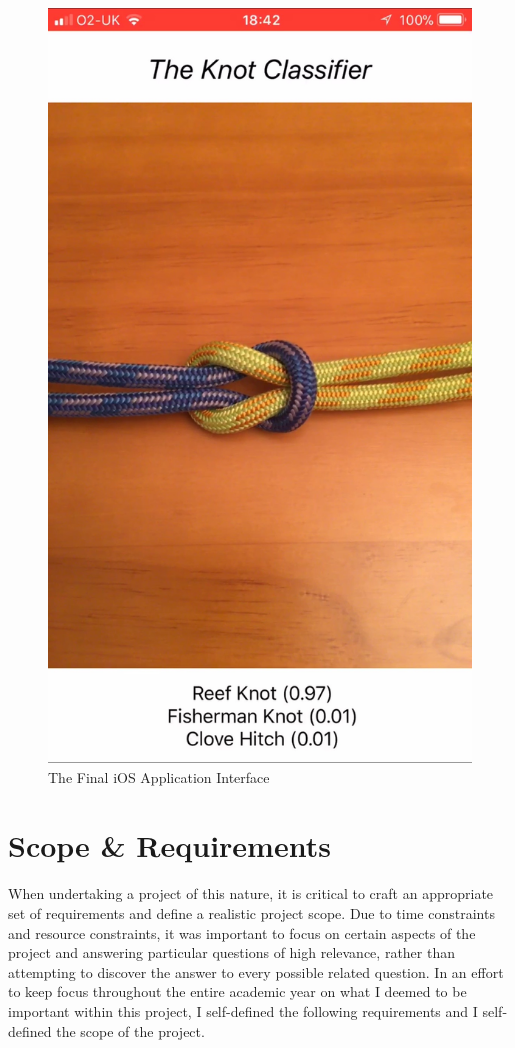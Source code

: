\documentclass{l4proj}
\begin{document}
\begin{figure}
	\centering
	\includegraphics[scale=0.1]{IntroApp}
	\caption{The Final iOS Application Interface}
	\label{fig:IntroApp}
\end{figure}

\section{Scope \& Requirements}
When undertaking a project of this nature, it is critical to craft an appropriate set of requirements and define a realistic project scope.
Due to time constraints and resource constraints, it was important to focus on certain aspects of the project and answering particular questions of high relevance, rather than attempting to discover the answer to every possible related question.
In an effort to keep focus throughout the entire academic year on what I deemed to be important within this project, I self-defined the following requirements and I self-defined the scope of the project.
\end{document}
